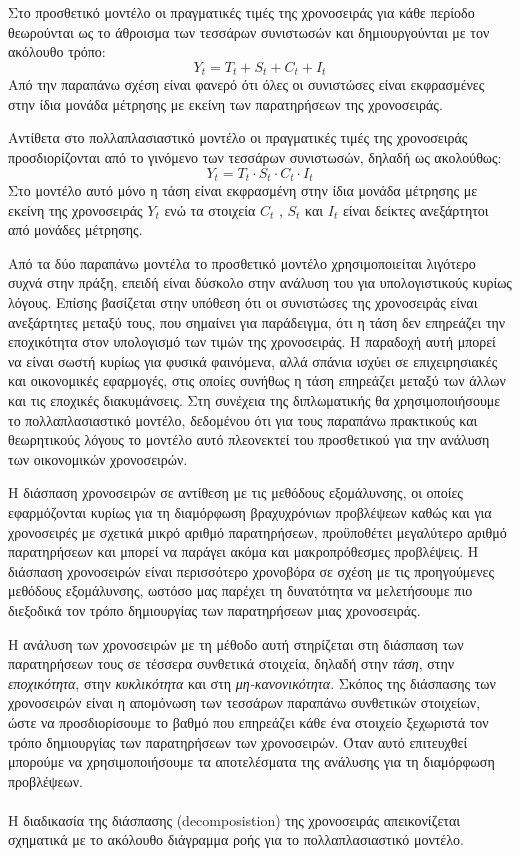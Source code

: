 Στο προσθετικό μοντέλο οι πραγματικές τιμές της χρονοσειράς για κάθε περίοδο
θεωρούνται ως το άθροισμα των τεσσάρων συνιστωσών και δημιουργούνται με τον
ακόλουθο τρόπο:\\
$$ Y_t=T_t+S_t+C_t+I_t $$
Από την παραπάνω σχέση είναι φανερό ότι όλες οι συνιστώσες είναι εκφρασμένες
στην ίδια μονάδα μέτρησης με εκείνη των παρατηρήσεων της χρονοσειράς.

Αντίθετα στο πολλαπλασιαστικό μοντέλο οι πραγματικές τιμές της χρονοσειράς
προσδιορίζονται από το γινόμενο των τεσσάρων συνιστωσών, δηλαδή ως ακολούθως:\\
$$ Y_t=T_t \cdot S_t \cdot C_t \cdot I_t $$
Στο μοντέλο αυτό μόνο η τάση είναι εκφρασμένη στην ίδια μονάδα μέτρησης με
εκείνη της χρονοσειράς $Y_t$ ενώ τα στοιχεία $C_t$ , $S_t$ και $Ι_t$ είναι δείκτες ανεξάρτητοι
από μονάδες μέτρησης.

Από τα δύο παραπάνω μοντέλα το προσθετικό μοντέλο χρησιμοποιείται λιγότερο
συχνά στην πράξη, επειδή είναι δύσκολο στην ανάλυση του για υπολογιστικούς
κυρίως λόγους. Επίσης βασίζεται στην υπόθεση ότι οι συνιστώσες της χρονοσειράς
είναι ανεξάρτητες μεταξύ τους, που σημαίνει για παράδειγμα, ότι η τάση δεν
επηρεάζει την εποχικότητα στον υπολογισμό των τιμών της χρονοσειράς. Η
παραδοχή αυτή μπορεί να είναι σωστή κυρίως για φυσικά φαινόμενα, αλλά σπάνια
ισχύει σε επιχειρησιακές και οικονομικές εφαρμογές, στις οποίες συνήθως η τάση
επηρεάζει μεταξύ των άλλων και τις εποχικές διακυμάνσεις. Στη συνέχεια της
διπλωματικής θα χρησιμοποιήσουμε το πολλαπλασιαστικό μοντέλο, δεδομένου ότι
για τους παραπάνω πρακτικούς και θεωρητικούς λόγους το μοντέλο αυτό πλεονεκτεί
του προσθετικού για την ανάλυση των οικονομικών χρονοσειρών.

Η διάσπαση χρονοσειρών σε
αντίθεση με τις μεθόδους εξομάλυνσης, οι οποίες εφαρμόζονται κυρίως για τη
διαμόρφωση βραχυχρόνιων προβλέψεων καθώς και για χρονοσειρές με σχετικά
μικρό αριθμό παρατηρήσεων, προϋποθέτει μεγαλύτερο
αριθμό παρατηρήσεων και μπορεί να παράγει ακόμα και μακροπρόθεσμες
προβλέψεις. Η διάσπαση χρονοσειρών είναι περισσότερο χρονοβόρα σε σχέση με τις
προηγούμενες μεθόδους εξομάλυνσης, ωστόσο μας παρέχει τη δυνατότητα να
μελετήσουμε πιο διεξοδικά τον τρόπο δημιουργίας των παρατηρήσεων μιας
χρονοσειράς.

Η ανάλυση των χρονοσειρών με τη μέθοδο αυτή στηρίζεται στη διάσπαση των
παρατηρήσεων τους σε τέσσερα συνθετικά στοιχεία, δηλαδή στην \textit{τάση}, στην
\textit{εποχικότητα}, στην \textit{κυκλικότητα} και στη \textit{μη-κανονικότητα}. Σκόπος της διάσπασης των
χρονοσειρών είναι η απομόνωση των τεσσάρων παραπάνω συνθετικών στοιχείων,
ώστε να προσδιορίσουμε το βαθμό που επηρεάζει κάθε ένα στοιχείο ξεχωριστά τον
τρόπο δημιουργίας των παρατηρήσεων των χρονοσειρών. Όταν αυτό επιτευχθεί
μπορούμε να χρησιμοποιήσουμε τα αποτελέσματα της ανάλυσης για τη διαμόρφωση
προβλέψεων.\\\\
Η διαδικασία της διάσπασης (decomposistion) της χρονοσειράς απεικονίζεται
σχηματικά με το ακόλουθο διάγραμμα ροής για το πολλαπλασιαστικό μοντέλο.\\

